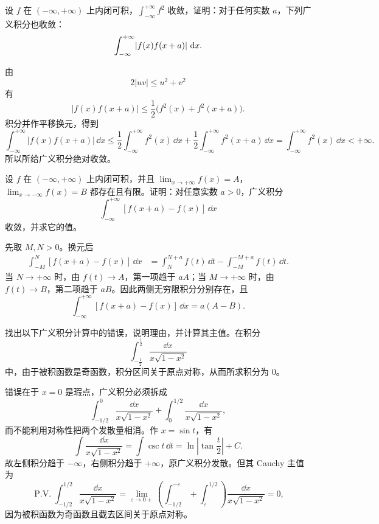 \begin{xexercise}[4]
设 $f$ 在 $(-\infty,+\infty)$ 上内闭可积，$\int_{-\infty}^{+\infty}f^2$ 收敛，证明：对于任何实数 $a$，下列广义积分也收敛：
  \[
    \int_{-\infty}^{+\infty}\lvert f(x)f(x+a)\rvert\,\mathop{}\!\mathrm{d} x.
  \]
\end{xexercise}
\begin{xsolution}
由
\[
  2|uv|\leq u^2+v^2
\]
有
\[
  |f(x)f(x+a)|\leq\frac12\bigl(f^2(x)+f^2(x+a)\bigr).
\]
积分并作平移换元，得到
\[
  \int_{-\infty}^{+\infty}|f(x)f(x+a)|\,\dd x
  \leq\frac12\int_{-\infty}^{+\infty}f^2(x)\,\dd x
  +\frac12\int_{-\infty}^{+\infty}f^2(x+a)\,\dd x
  =\int_{-\infty}^{+\infty}f^2(x)\,\dd x<+\infty.
\]
所以所给广义积分绝对收敛。
\end{xsolution}


\begin{xexercise}[5]
设 $f$ 在 $(-\infty,+\infty)$ 上内闭可积，并且 $\lim_{x\to+\infty}f(x)=A$，$\lim_{x\to-\infty}f(x)=B$ 都存在且有限。证明：对任意实数 $a>0$，广义积分
  \[
    \int_{-\infty}^{+\infty}[f(x+a)-f(x)]\,\dd x
  \]
  收敛，并求它的值。
\end{xexercise}
\begin{xsolution}
先取 $M,N>0$。换元后
\begin{align*}
  \int_{-M}^{N}[f(x+a)-f(x)]\,\dd x
  &=\int_{N}^{N+a}f(t)\,\dd t-\int_{-M}^{-M+a}f(t)\,\dd t.
\end{align*}
当 $N\to+\infty$ 时，由 $f(t)\to A$，第一项趋于 $aA$；当 $M\to+\infty$ 时，由 $f(t)\to B$，第二项趋于 $aB$。因此两侧无穷限积分分别存在，且
\[
  \int_{-\infty}^{+\infty}[f(x+a)-f(x)]\,\dd x=a(A-B).
\]
\end{xsolution}


\begin{xexercise}[6]
找出以下广义积分计算中的错误，说明理由，并计算其主值。在积分
  \[
    \int_{-\frac12}^{\frac12}\frac{\dd x}{x\sqrt{1-x^2}}
  \]
  中，由于被积函数是奇函数，积分区间关于原点对称，从而所求积分为 0。
\end{xexercise}
\begin{xsolution}
错误在于 $x=0$ 是瑕点，广义积分必须拆成
\[
  \int_{-1/2}^{0}\frac{\dd x}{x\sqrt{1-x^2}}
  +\int_{0}^{1/2}\frac{\dd x}{x\sqrt{1-x^2}},
\]
而不能利用对称性把两个发散量相消。作 $x=\sin t$，有
\[
  \int\frac{\dd x}{x\sqrt{1-x^2}}=\int\csc t\,\dd t
  =\ln\left|\tan\frac t2\right|+C.
\]
故左侧积分趋于 $-\infty$，右侧积分趋于 $+\infty$，原广义积分发散。但其 Cauchy 主值为
\[
  \operatorname{P.V.}\int_{-1/2}^{1/2}\frac{\dd x}{x\sqrt{1-x^2}}
  =\lim_{\varepsilon\to0+}
  \left(\int_{-1/2}^{-\varepsilon}+\int_{\varepsilon}^{1/2}\right)
  \frac{\dd x}{x\sqrt{1-x^2}}=0,
\]
因为被积函数为奇函数且截去区间关于原点对称。
\end{xsolution}


